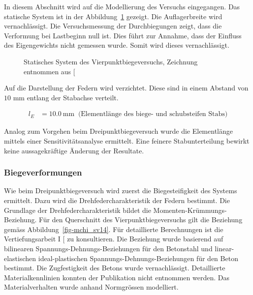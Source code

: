 \documentclass[
  11pt,
  letterpaper,
]{scrreprt}
\begin{document}
In diesem Abschnitt wird auf die Modellierung des Versuchs eingegangen.
Das statische System ist in der Abbildung~\ref{fig-system-SV14} gezeigt.
Die Auflagerbreite wird vernachlässigt. Die Versuchsmessung der
Durchbiegungen zeigt, dass die Verformung bei Lastbeginn null ist. Dies
führt zur Annahme, dass der Einfluss des Eigengewichts nicht gemessen
wurde. Somit wird dieses vernachlässigt.

\begin{figure}[H]


\caption{\label{fig-system-SV14}Statisches System des
Vierpunktbiegeversuchs, Zeichnung entnommen aus
{[}\citeproc{ref-gitz_ansatze_2024}{1}{]}}

\end{figure}%

Auf die Darstellung der Federn wird verzichtet. Diese sind in einem
Abstand von \(10\) mm entlang der Stabachse verteilt.

$$
\begin{aligned}
l_{E} &= 10.0\ \mathrm{mm} \; \;\textrm{(Elementlänge des biege- und schubsteifen Stabs)}
\end{aligned}
$$

Analog zum Vorgehen beim Dreipunktbiegeversuch wurde die Elementlänge
mittels einer Sensitivitätsanalyse ermittelt. Eine feinere
Stabunterteilung bewirkt keine aussagekräftige Änderung der Resultate.

\subsubsection{Biegeverformungen}\label{biegeverformungen-1}

Wie beim Dreipunktbiegeversuch wird zuerst die Biegesteifigkeit des
Systems ermittelt. Dazu wird die Drehfedercharakteristik der Federn
bestimmt. Die Grundlage der Drehfedercharakteristik bildet die
Momenten-Krümmungs-Beziehung. Für den Querschnitt des
Vierpunktbiegeversuchs gilt die Beziehung gemäss
Abbildung~\ref{fig-mchi_sv14}. Für detaillierte Berechnungen ist die
Vertiefungsarbeit I {[}\citeproc{ref-gitz_ansatze_2024}{1}{]} zu
konsultieren. Die Beziehung wurde basierend auf bilinearen
Spannungs-Dehnungs-Beziehungen für den Betonstahl und linear-elastischen
ideal-plastischen Spannungs-Dehnungs-Beziehungen für den Beton bestimmt.
Die Zugfestigkeit des Betons wurde vernachlässigt. Detaillierte
Materialkennlinien konnten der Publikation nicht entnommen werden. Das
Materialverhalten wurde anhand Normgrössen modelliert.
\end{document}
